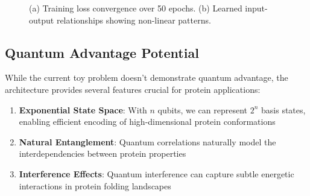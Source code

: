 \documentclass[11pt,a4paper]{article}
\begin{document}
\begin{figure}[h]
\centering
{}
\hfill
{}
\caption{(a) Training loss convergence over 50 epochs. (b) Learned input-output relationships showing non-linear patterns.}
\label{fig:results}
\end{figure}

\subsection{Quantum Advantage Potential}

While the current toy problem doesn't demonstrate quantum advantage, the architecture provides several features crucial for protein applications:

\begin{enumerate}
    \item \textbf{Exponential State Space}: With $n$ qubits, we can represent $2^n$ basis states, enabling efficient encoding of high-dimensional protein conformations
    \item \textbf{Natural Entanglement}: Quantum correlations naturally model the interdependencies between protein properties
    \item \textbf{Interference Effects}: Quantum interference can capture subtle energetic interactions in protein folding landscapes
\end{enumerate}
\end{document}
